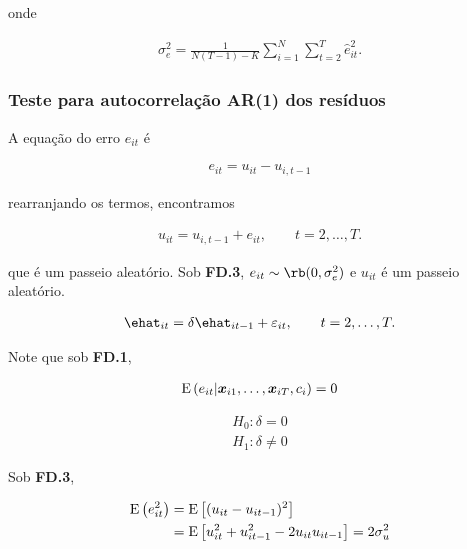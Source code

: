\documentclass[11pt, oneside, a4paper, article]{article}
\numberwithin{equation}{section}
\begin{document}
\begin{description}
\noindent onde


\vspace{-1 em}
\begin{align*} 
\sigma_{e}^2 = 
\frac{1}{N(T-1) - K} \sum_{i=1}^{N}\sum_{t=2}^{T} \widehat{e}^{2}_{it}.
\end{align*}

\subsubsection{Teste para autocorrelação AR(1) dos resíduos}

A equação do erro $e_{it}$ é 

\vspace{-1 em}
\begin{align*}
e_{it} = u_{it} - u_{i,t-1}
\end{align*}

\noindent 
rearranjando os termos, encontramos

\vspace{-1 em}
\begin{align*}
	\boxed{u_{it} =  u_{i,t-1} + e_{it} } ,
\qquad t=2, \dots, T.
\end{align*}

\noindent
que é um passeio aleatório.
Sob \textbf{FD.3}, 
$e_{it} \sim \rb(0, \sigma^2_{e})$ e $u_{it}$ é um passeio aleatório.

\vspace{-1 em}
\begin{align*}
	\ehat_{it} = \delta \ehat_{it-1}  + \err_{it},
	\qquad  t=2, \dots, T.
\end{align*}

\noindent
Note que sob \textbf{FD.1}, 

\vspace{-1 em}
\begin{align*}
	\text{E}\left( e_{it} | \boldsymbol{x}_{i1}, \dots, \boldsymbol{x}_{iT}, c_{i} \right) = 0
\end{align*}

\vspace{-2 em}
\begin{align*}
	H_{0}: \delta = 0
	\\
	H_{1}: \delta \neq 0
\end{align*}

Sob \textbf{FD.3},

\vspace{-1 em}
\begin{align*}
\text{E}\left( e_{it}^2 \right) &=
\text{E}\left[ (u_{it} - u_{it-1})^2 \right]
\\ &=
\text{E}\left[ u_{it}^2 + u_{it-1}^2 - 2u_{it}u_{it-1} \right]
= 2 \sigma_{u}^2
\end{align*}


\end{description}
\end{document}
